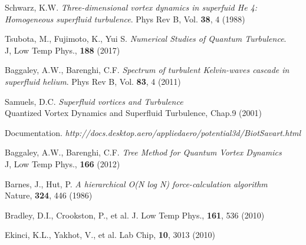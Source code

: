 \begin{thebibliography}{99}

	{\sc Schwarz, K.W.}
	\emph{Three-dimensional vortex dynamics in superfuid He 4: Homogeneous superfluid turbulence}. Phys Rev B, Vol. \textbf{38}, 4 (1988)

	{\sc Tsubota, M., Fujimoto, K., Yui S.}
	\emph{Numerical Studies of Quantum Turbulence}.\\
	J, Low Temp Phys., \textbf{188} (2017)

	{\sc Baggaley, A.W., Barenghi, C.F.}
	\emph{Spectrum of turbulent Kelvin-waves cascade in superfluid helium}.
	Phys Rev B, Vol. \textbf{83}, 4 (2011)

	{\sc Samuels, D.C.}
	\emph{Superfluid vortices and Turbulence}\\
	Quantized Vortex Dynamics and Superfluid Turbulence, Chap.9 (2001)

	{\sc Documentation}.
	\emph{http://docs.desktop.aero/appliedaero/potential3d/BiotSavart.html}

	{\sc Baggaley, A.W., Barenghi, C.F.}
	\emph{Tree Method for Quantum Vortex Dynamics}\\
	J, Low Temp Phys., \textbf{166} (2012)

	{\sc Barnes, J., Hut, P.}
	\emph{A hierarchical O(N log N) force-calculation algorithm}\\
	Nature, \textbf{324}, 446 (1986)


	{\sc Bradley, D.I., Crookston, P., et al.}
	\emph{} J. Low Temp Phys., \textbf{161}, 536 (2010)

	{\sc Ekinci, K.L., Yakhot, V., et al.}
	\emph{} Lab Chip, \textbf{10}, 3013 (2010)



\end{thebibliography}
